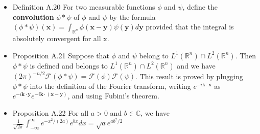 \begin{itemize}
\item Definition A.20 For two measurable functions $\phi$ and $\psi$, define the \textbf{convolution} $\phi * \psi$ of $\phi$ and $\psi$ by the formula $(\phi * \psi)(\mathbf{x})=\int_{\mathbb{R}^{n}} \phi(\mathbf{x}-\mathbf{y}) \psi(\mathbf{y}) d \mathbf{y}$ provided that the integral is absolutely convergent for all $\mathrm{x}$.

\item Proposition A.21 Suppose that $\phi$ and $\psi$ belong to $L^{1}\left(\mathbb{R}^{n}\right) \cap L^{2}\left(\mathbb{R}^{n}\right)$. Then $\phi * \psi$ is defined and belongs to $L^{1}\left(\mathbb{R}^{n}\right) \cap L^{2}\left(\mathbb{R}^{n}\right)$ and we have $(2 \pi)^{-n / 2} \mathcal{F}(\phi * \psi)=\mathcal{F}(\phi) \mathcal{F}(\psi)$. This result is proved by plugging $\phi * \psi$ into the definition of the Fourier transform, writing $e^{-i \mathbf{k} \cdot \mathbf{x}}$ as $e^{-i \mathbf{k} \cdot \mathbf{y}} e^{-i \mathbf{k} \cdot(\mathbf{x}-\mathbf{y})}$, and using Fubini's theorem.

\item Proposition A.22 For all $a>0$ and $b \in \mathbb{C}$, we have $\frac{1}{\sqrt{2 \pi}} \int_{-\infty}^{\infty} e^{-x^{2} /(2 a)} e^{b x} d x=\sqrt{a} e^{a b^{2} / 2}$
\end{itemize}

